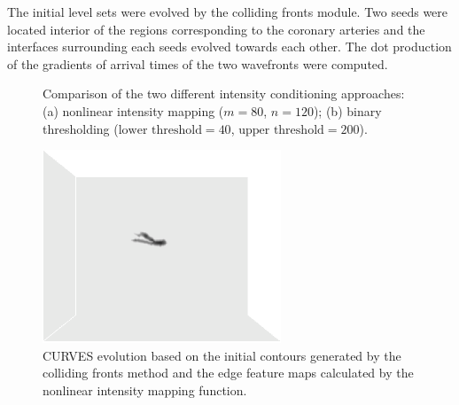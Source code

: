 The initial level sets were evolved by the colliding fronts module.
Two seeds were located interior of the regions corresponding to the coronary arteries and the interfaces surrounding each seeds evolved towards each other.
The dot production of the gradients of arrival times of the two wavefronts were computed.
\begin{figure}[!htb]
\centering
{}
\hfil
{}
\caption{Comparison of the two different intensity conditioning approaches: (a) nonlinear intensity mapping ($m = 80$, $n = 120$); (b) binary thresholding ($\text{lower threshold} = 40$, $\text{upper threshold} = 200$).}%
\label{fig:IntensityConditioning}
\end{figure}
\begin{figure}[!htb]
\centering
\includegraphics[width=2.8in]{Figures/curves.png}
\caption{CURVES evolution based on the initial contours generated by the colliding fronts method and the edge feature maps calculated by the nonlinear intensity mapping function.}%
\label{fig:CURVES}
\end{figure}
